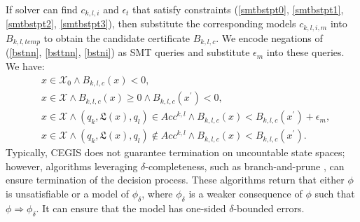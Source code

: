 \documentclass[acmlarge]{acmart}
\begin{document}
If solver can find $c_{k, l, i}$ and $\epsilon_{t}$ that satisfy constraints (\ref{smtbstpt0}, \ref{smtbstpt1}, \ref{smtbstpt2}, \ref{smtbstpt3}), then substitute the corresponding models $c_{k, l, i, m}$ into $B_{k, l, temp}$ to obtain the candidate certificate $B_{k, l, c}$. We encode negations of (\ref{bstnn}, \ref{bsttnn}, \ref{bstni}) as SMT queries and substitute $\epsilon_{m}$ into these queries. We have:
\begin{align}
  &x \in \mathcal{X}_0 \land B_{k, l, c}(x) < 0, \label{smtbstpc0}\\
  &x \in \mathcal{X} \land B_{k, l, c}(x) \geq 0 \land B_{k, l, c}(x^{\prime}) < 0, \label{smtbstpc1}\\
  &x \in \mathcal{X} \land (q_k, \mathfrak{L}(x), q_l) \in Acc^{k, l} \land B_{k, l, c}(x) < B_{k, l, c}(x^{\prime}) + \epsilon_{m}, \label{smtbstpc2}\\
  &x \in \mathcal{X} \land (q_k, \mathfrak{L}(x), q_l) \not\in Acc^{k, l} \land B_{k, l, c}(x) < B_{k, l, c}(x^{\prime}). \label{smtbstpc3}
\end{align}
Typically, CEGIS does not guarantee termination on uncountable state spaces; however, algorithms leveraging $\delta$-completeness, such as branch-and-prune \cite{gao2012delta, kong2018delta}, can ensure termination of the decision process. These algorithms return that either $\phi$ is unsatisfiable or a model of $\phi_{\delta}$, where $\phi_{\delta}$ is a weaker consequence of $\phi$ such that $\phi \Rightarrow \phi_{\delta}$. It can ensure that the model has one-sided $\delta$-bounded errors. 

\end{document}
